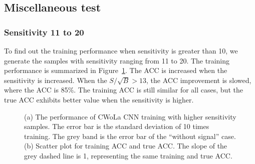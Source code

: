 \documentclass[12pt]{article}
\begin{document}
	\subsection{Miscellaneous test}%
	\label{sub:miscellaneous_test}
		\subsubsection{Sensitivity 11 to 20}%
		\label{subs:sensitivity_11_to_20}
			To find out the training performance when sensitivity is greater than 10, we generate the samples with sensitivity ranging from 11 to 20. The training performance is summarized in Figure~\ref{fig:cwola_cnn_training_performance_11_20}. The ACC is increased when the sensitivity is increased. When the $S / \sqrt{B} > 13$, the ACC improvement is slowed, where the ACC is 85\%. The training ACC is still similar for all cases, but the true ACC exhibits better value when the sensitivity is higher.
			\begin{figure}[htpb]
				\centering
				\caption{(a) The performance of CWoLa CNN training with higher sensitivity samples. The error bar is the standard deviation of 10 times training. The grey band is the error bar of the ``without signal'' case. (b) Scatter plot for training ACC and true ACC. The slope of the grey dashed line is 1, representing the same training and true ACC.}
				\label{fig:cwola_cnn_training_performance_11_20}
			\end{figure}
\end{document}
